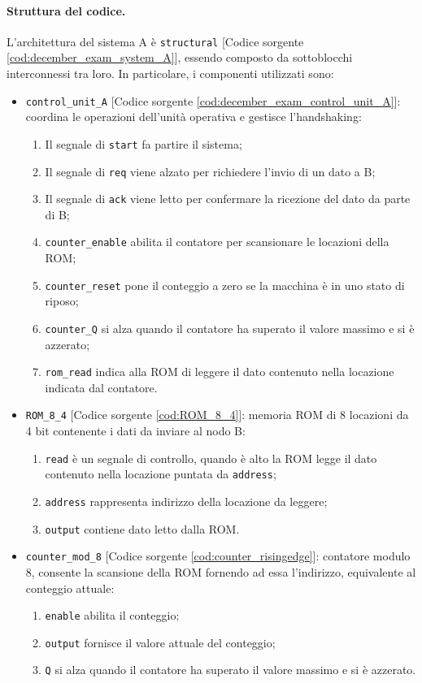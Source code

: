 \paragraph{Struttura del codice.}
L'architettura del sistema A è \texttt{structural} [Codice sorgente \ref{cod:december_exam_system_A}], essendo composto da sottoblocchi interconnessi tra loro. In particolare, i componenti utilizzati sono:

\begin{itemize}
    \item \texttt{control\_unit\_A} [Codice sorgente \ref{cod:december_exam_control_unit_A}]: coordina le operazioni dell'unità operativa e gestisce l'handshaking:
    \begin{enumerate}
        \item Il segnale di \texttt{start} fa partire il sistema;
        \item Il segnale di \texttt{req} viene alzato per richiedere l'invio di un dato a B;
        \item Il segnale di \texttt{ack} viene letto per confermare la ricezione del dato da parte di B;
        \item \texttt{counter\_enable} abilita il contatore per scansionare le locazioni della ROM;
        \item \texttt{counter\_reset} pone il conteggio a zero se la macchina è in uno stato di riposo;
        \item \texttt{counter\_Q} si alza quando il contatore ha superato il valore massimo e si è azzerato;
        \item \texttt{rom\_read} indica alla ROM di leggere il dato contenuto nella locazione indicata dal contatore.
    \end{enumerate}
    \item \texttt{ROM\_8\_4} [Codice sorgente \ref{cod:ROM_8_4}]: memoria ROM di 8 locazioni da 4 bit contenente i dati da inviare al nodo B:
    \begin{enumerate}
        \item \texttt{read} è un segnale di controllo, quando è alto la ROM legge il dato contenuto nella locazione puntata da \texttt{address};
        \item \texttt{address} rappresenta indirizzo della locazione da leggere;
        \item \texttt{output} contiene dato letto dalla ROM.
    \end{enumerate}
    \item \texttt{counter\_mod\_8} [Codice sorgente \ref{cod:counter_risingedge}]: contatore modulo 8, consente la scansione della ROM fornendo ad essa l'indirizzo, equivalente al conteggio attuale:
    \begin{enumerate}
        \item \texttt{enable} abilita il conteggio;
        \item \texttt{output} fornisce il valore attuale del conteggio;
        \item \texttt{Q} si alza quando il contatore ha superato il valore massimo e si è azzerato.
    \end{enumerate}
\end{itemize}

